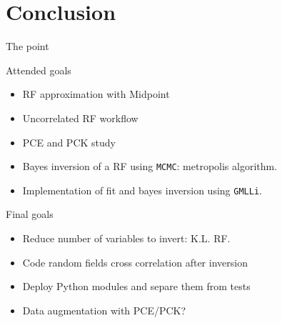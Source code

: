 	\section{Conclusion}
	
	\begin{frame}{The point}
	\begin{block}{Attended goals}
	\begin{itemize}
	\item RF approximation with Midpoint
	\item Uncorrelated RF workflow
	\item PCE and PCK study
	\item Bayes inversion of a RF using \texttt{MCMC}: metropolis algorithm. 
	\item Implementation of fit and bayes inversion using \texttt{GMLLi}.
	\end{itemize}
	\end{block}
	
	\begin{block}{Final goals}
	\begin{itemize}
	\item Reduce number of variables to invert: K.L. RF.
	\item Code random fields cross correlation after inversion
	\item Deploy Python modules and separe them from tests
	\item Data augmentation with PCE/PCK?
	\end{itemize}
	\end{block}
	\end{frame}